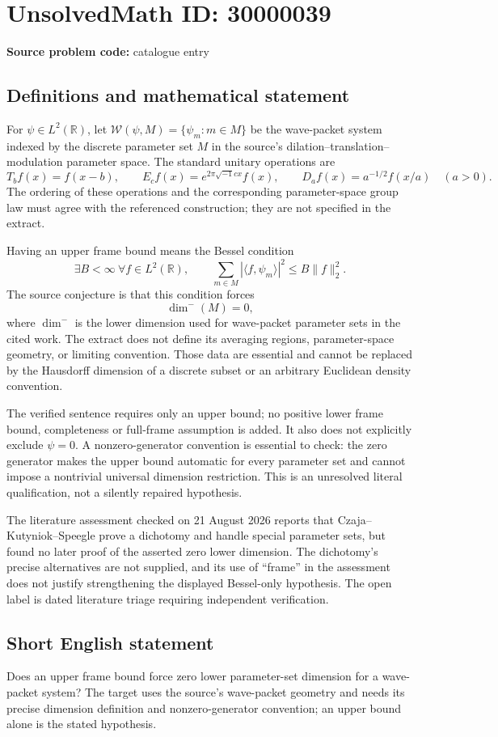 \documentclass[11pt]{article}
\newcommand{\R}{\mathbb{R}}
\begin{document}
\section*{UnsolvedMath ID: 30000039}
\textbf{Source problem code:} catalogue entry
\subsection{Definitions and mathematical statement}
For $\psi\in L^2(\R)$, let $\mathcal W(\psi,M)=\{\psi_m:m\in M\}$ be the wave-packet system indexed by the discrete parameter set $M$ in the source's dilation--translation--modulation parameter space. The standard unitary operations are
\[
 T_bf(x)=f(x-b),\qquad E_cf(x)=e^{2\pi\sqrt{-1}cx}f(x),\qquad
 D_af(x)=a^{-1/2}f(x/a)\quad(a>0).
\]
The ordering of these operations and the corresponding parameter-space group law must agree with the referenced construction; they are not specified in the extract.

Having an upper frame bound means the Bessel condition
\[
 \exists B<\infty\ \forall f\in L^2(\R),\qquad
 \sum_{m\in M}|\langle f,\psi_m\rangle|^2\le B\|f\|_2^2.
\]
The source conjecture is that this condition forces
\[
 \dim^-(M)=0,
\]
where $\dim^-$ is the lower dimension used for wave-packet parameter sets in the cited work. The extract does not define its averaging regions, parameter-space geometry, or limiting convention. Those data are essential and cannot be replaced by the Hausdorff dimension of a discrete subset or an arbitrary Euclidean density convention.

The verified sentence requires only an upper bound; no positive lower frame bound, completeness or full-frame assumption is added. It also does not explicitly exclude $\psi=0$. A nonzero-generator convention is essential to check: the zero generator makes the upper bound automatic for every parameter set and cannot impose a nontrivial universal dimension restriction. This is an unresolved literal qualification, not a silently repaired hypothesis.

The literature assessment checked on 21 August 2026 reports that Czaja--Kutyniok--Speegle prove a dichotomy and handle special parameter sets, but found no later proof of the asserted zero lower dimension. The dichotomy's precise alternatives are not supplied, and its use of ``frame'' in the assessment does not justify strengthening the displayed Bessel-only hypothesis. The open label is dated literature triage requiring independent verification.
\subsection{Short English statement}
Does an upper frame bound force zero lower parameter-set dimension for a wave-packet system? The target uses the source's wave-packet geometry and needs its precise dimension definition and nonzero-generator convention; an upper bound alone is the stated hypothesis.
\end{document}
